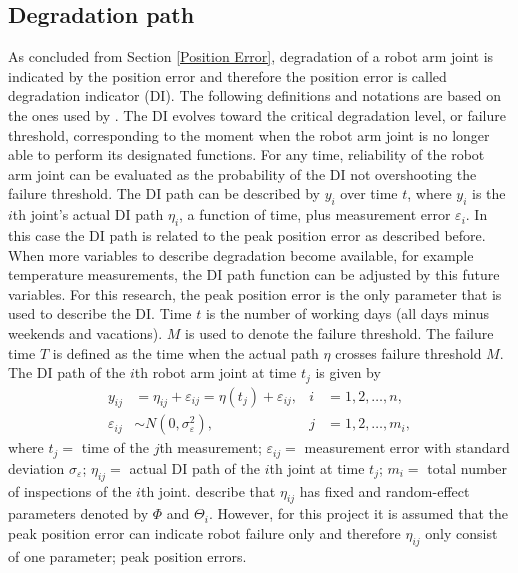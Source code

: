 \subsection{Degradation path} \label{Degradation path}
As concluded from Section \ref{Position Error}, degradation of a robot arm joint is indicated by the position error and therefore the position error is called degradation indicator (DI). The following definitions and notations are based on the ones used by \citet{Lu1993}. The DI evolves toward the critical degradation level, or failure threshold, corresponding to the moment when the robot arm joint is no longer able to perform its designated functions. For any time, reliability of the robot arm joint can be evaluated as the probability of the DI not overshooting the failure threshold. The DI path can be described by $y_i$ over time $t$, where $y_i$ is the $i$th joint's actual DI path $\eta_i$, a function of time, plus measurement error $\varepsilon_i$. In this case the DI path is related to the peak position error as described before. When more variables to describe degradation become available, for example temperature measurements, the DI path function can be adjusted by this future variables. For this research, the peak position error is the only parameter that is used to describe the DI. Time $t$ is the number of working days (all days minus weekends and vacations). $M$ is used to denote the failure threshold. The failure time $T$ is defined as the time when the actual path $\eta$ crosses failure threshold $M$. The DI path of the $i$th robot arm joint at time $t_j$ is given by 
\begin{equation} \label{eq:degradation path}
\begin{aligned} 
	y_{ij} & = \eta_{ij} + \varepsilon_{ij} = \eta(t_j) + \varepsilon_{ij},& i & =1,2,\ldots,n, \\    
    \varepsilon_{ij} & \sim N(0,\sigma^{2}_{\varepsilon}),& j & =1,2,\ldots,m_i,
\end{aligned}
\end{equation}
where $t_j =$ time of the $j$th measurement; $\varepsilon_{ij}=$ measurement error with  standard deviation $\sigma_{\varepsilon}$; $\eta_{ij}=$ actual DI path of the $i$th joint at time $t_j$; $m_i=$ total number of inspections of the $i$th joint. \citet{Lu1993} describe that $\eta_{ij}$ has fixed and random-effect parameters denoted by $\Phi$ and $\Theta_{i}$. However, for this project it is assumed that the peak position error can indicate robot failure only and therefore $\eta_{ij}$ only consist of one parameter; peak position errors.

